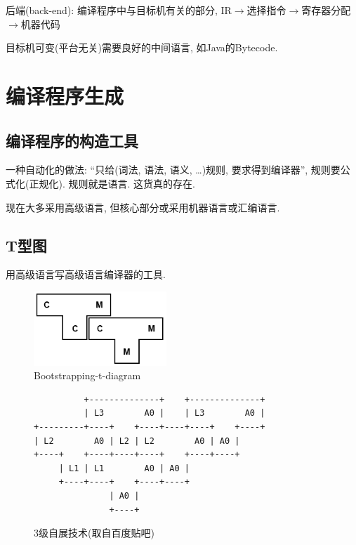         \textsf{后端}(back-end): 编译程序中与目标机有关的部分, IR$\to$选择指令$\to$寄存器分配$\to$机器代码

        目标机可变(平台无关)需要良好的中间语言, 如Java的Bytecode.

\section{编译程序生成}

    \subsection{编译程序的构造工具}

        一种自动化的做法: ``只给(词法, 语法, 语义, \ldots)规则, 要求得到编译器'', 规则要公式化(正规化). 规则就是语言. 这货真的存在.

        现在大多采用高级语言, 但核心部分或采用机器语言或汇编语言.

    \subsection{T型图}

        用高级语言写高级语言编译器的工具.

        \begin{figure}[h]\centering
                \includegraphics[width=5cm]{compile_chaps/lect2_inc/Bootstrapping-t-diagram.png}
                \caption{Bootstrapping-t-diagram}
                \label{fig:2:bootstrapping}
        \end{figure}

        \begin{figure}[h] \centering
            \begin{minipage}{0.65\linewidth}
                \begin{center}
                {\small
\begin{verbatim}          +--------------+    +--------------+
          | L3        A0 |    | L3        A0 |
+---------+----+    +----+----+----+    +----+
| L2        A0 | L2 | L2        A0 | A0 |
+----+    +----+----+----+    +----+----+
     | L1 | L1        A0 | A0 |
     +----+----+    +----+----+
               | A0 |
               +----+\end{verbatim}}
                \end{center}
                \caption{3级自展技术(取自百度贴吧)}
                \label{fig:2:3-self-extract}
            \end{minipage}
        \end{figure}


